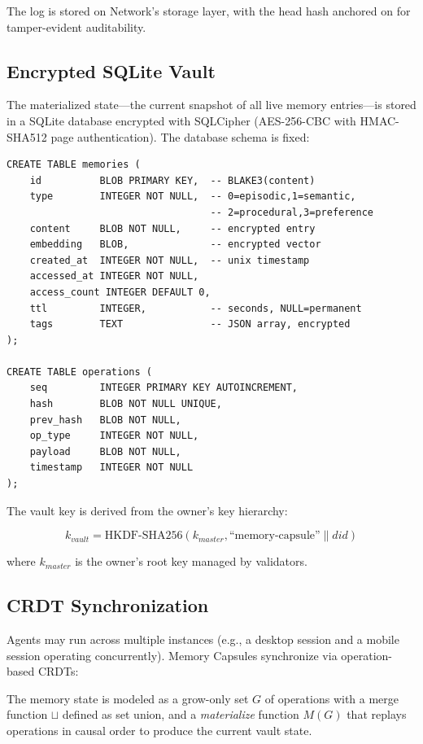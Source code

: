 The log is stored on \Zoo{} Network's storage layer, with the head hash anchored on \IChain{} for tamper-evident auditability.

\subsection{Encrypted SQLite Vault}

The materialized state---the current snapshot of all live memory entries---is stored in a SQLite database encrypted with SQLCipher (AES-256-CBC with HMAC-SHA512 page authentication). The database schema is fixed:

\begin{verbatim}
CREATE TABLE memories (
    id          BLOB PRIMARY KEY,  -- BLAKE3(content)
    type        INTEGER NOT NULL,  -- 0=episodic,1=semantic,
                                   -- 2=procedural,3=preference
    content     BLOB NOT NULL,     -- encrypted entry
    embedding   BLOB,              -- encrypted vector
    created_at  INTEGER NOT NULL,  -- unix timestamp
    accessed_at INTEGER NOT NULL,
    access_count INTEGER DEFAULT 0,
    ttl         INTEGER,           -- seconds, NULL=permanent
    tags        TEXT               -- JSON array, encrypted
);

CREATE TABLE operations (
    seq         INTEGER PRIMARY KEY AUTOINCREMENT,
    hash        BLOB NOT NULL UNIQUE,
    prev_hash   BLOB NOT NULL,
    op_type     INTEGER NOT NULL,
    payload     BLOB NOT NULL,
    timestamp   INTEGER NOT NULL
);
\end{verbatim}

The vault key is derived from the owner's \KChain{} key hierarchy:

\begin{equation}
k_{\textit{vault}} = \text{HKDF-SHA256}(k_{\textit{master}}, \text{``memory-capsule''} \| \textit{did})
\end{equation}

where $k_{\textit{master}}$ is the owner's root key managed by \KChain{} validators.

\subsection{CRDT Synchronization}

Agents may run across multiple instances (e.g., a desktop session and a mobile session operating concurrently). Memory Capsules synchronize via operation-based CRDTs:

\begin{definition}
The memory state is modeled as a grow-only set $G$ of operations with a merge function $\sqcup$ defined as set union, and a \emph{materialize} function $M(G)$ that replays operations in causal order to produce the current vault state.
\end{definition}

